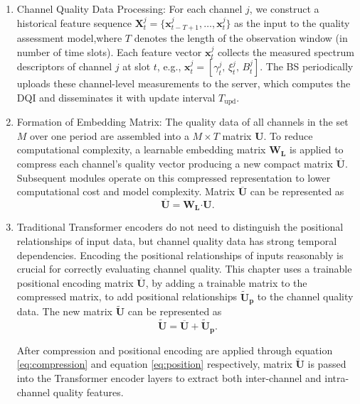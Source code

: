 \documentclass[journal]{IEEEtran}
\begin{document}
	\begin{enumerate}
		\item Channel Quality Data Processing: For each channel $j$, we construct a historical feature sequence $\mathbf{X}_t^{j}=\{\mathbf{x}_{t-T+1}^{j},\ldots,\mathbf{x}_{t}^{j}\}$ as the input to the quality assessment model,where $T$ denotes the length of the observation window (in number of time slots). Each feature vector $\mathbf{x}_{t}^{j}$ collects the measured spectrum descriptors of channel $j$ at slot $t$, e.g., $\mathbf{x}_{t}^{j}=[\gamma_{t}^{j},\,\xi_{t}^{j},\,B_{t}^{j}]$. The BS periodically uploads these channel-level measurements to the server, which computes the DQI and disseminates it with update interval $T_{\mathrm{upd}}$.
		\item Formation of Embedding Matrix: The quality data of all channels in the set $M$ over one period are assembled into a $M \times T$ matrix $\mathbf{U}$. To reduce computational complexity, a learnable embedding matrix $\mathbf{W_L}$ is applied to compress each channel's quality vector producing a new compact matrix $\mathbf{\overline U}$. Subsequent modules operate on this compressed representation to lower computational cost and model complexity. Matrix $\mathbf{\overline U}$  can be represented as
		\begin{equation}
			\mathbf{\overline U} = \mathbf{W_L} \mathbf{\cdot U}.
			\label{eq:compression}
		\end{equation}
		\item Traditional Transformer encoders do not need to distinguish the positional relationships of input data, but channel quality data has strong temporal dependencies. Encoding the positional relationships of inputs reasonably is crucial for correctly evaluating channel quality. This chapter uses a trainable positional encoding matrix $\mathbf{\overline U}$, by adding a trainable matrix to the compressed matrix, to add positional relationships $\mathbf{\tilde{U}_p}$ to the channel quality data. The new matrix $\mathbf{\tilde{U}}$ can be represented as \begin{equation}
			\mathbf{\tilde{U}} = \mathbf{\overline U} + \mathbf{\tilde{U}_p}.
			\label{eq:position} 
		\end{equation}
		\par 
		After compression and positional encoding are applied through equation \eqref{eq:compression} and equation \eqref{eq:position} respectively, matrix $ \mathbf{\tilde{U}}$ is passed into the Transformer encoder layers to extract both inter-channel and intra-channel quality features.
	\end{enumerate}
\end{document}
